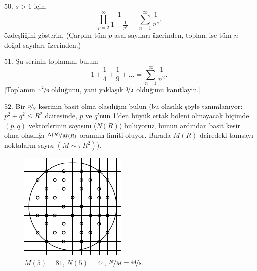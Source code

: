 \begin{problem}{50.}
	$s>1$ için, 
	\begin{equation*}
		\textstyle\prod\limits_{p=2}^{\infty} \frac{1}{1-\frac{1}{p^s}}=\textstyle\sum\limits_{n=1}^{\infty} \frac{1}{n^s}.
	\end{equation*}
özdeşliğini gösterin. (Çarpım tüm $p$ asal sayıları üzerinden, toplam ise tüm $n$ doğal sayıları üzerinden.)
\end{problem}

\begin{problem}{51.}
	Şu serinin toplamını bulun:
	\begin{equation*}
		1+ \frac{1}{4}+ \frac{1}{9}+\dots=\textstyle\sum\limits_{n=1}^{\infty} \frac{1}{n^2}.
	\end{equation*}
	[Toplamın $\nicefrac{\pi^2}{6}$ olduğunu, yani yaklaşık $\nicefrac{3}{2}$ olduğunu kanıtlayın.]
\end{problem}

\begin{problem}{52.}
	Bir  $\nicefrac{p}{q}$ kesrinin basit olma olasılığını bulun  (bu olasılık şöyle tanımlanıyor:
	$p^2+q^2 \leqslant R^2$ dairesinde, $p$ ve $q$'nun 1'den büyük ortak böleni olmayacak biçimde $(p,q)$ vektörlerinin sayısını ($N(R)$) bu\-lu\-yo\-ruz, bunun ardından basit kesir olma olasılığı 
$\nicefrac{N(R)}{M(R)}$ oranının limiti oluyor. Burada  $M(R)$ dairedeki tamsayı noktaların sayısı $(M \sim \pi R^2)$).
	\begin{figure}
		\includegraphics{resources/taskbook-36}\\
		\footnotesize $M(5)=81$, $N(5)=44$, $\nicefrac{N}{M} = \nicefrac{44}{81}$
	\end{figure}
\end{problem}

